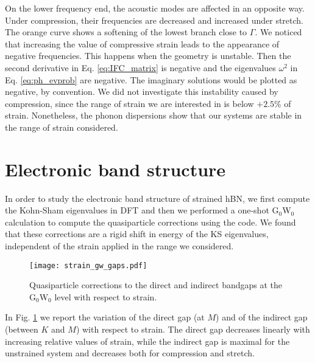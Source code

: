 On the lower frequency end, the acoustic modes are affected in an opposite way. Under compression, their frequencies are decreased and increased under stretch. The orange curve shows a softening of the lowest branch close to $\Gamma$. We noticed that increasing the value of compressive strain leads to the appearance of negative frequencies. This happens when the geometry is unstable. Then the second derivative in Eq. \eqref{eq:IFC_matrix} is negative and the eigenvalues $\omega^2$ in Eq. \eqref{eq:ph_evprob} are negative. The imaginary solutions would be plotted as negative, by convention. We did not investigate this instability caused by compression, since the range of strain we are interested in is below $+2.5\%$ of strain. Nonetheless, the phonon dispersions show that our systems are stable in the range of strain considered.

%
\section{Electronic band structure}
In order to study the electronic band structure of strained hBN, we first compute the Kohn-Sham eigenvalues in \acrshort{DFT} and then we performed a one-shot G$_0$W$_0$ calculation to compute the quasiparticle corrections using the \yambo code.\cite{Sangalli_2019} We found that these corrections are a rigid shift in energy of the KS eigenvalues, independent of the strain applied in the range we considered. 
\begin{figure}[tbp]
	\vspace{0.5cm}
	\setcapindent{2em}
	\centering
	\texttt{[image: strain\_gw\_gaps.pdf]}
	\caption{Quasiparticle corrections to the direct and indirect bandgaps at the G$_0$W$_0$ level with respect to strain.}
	\label{fig:strain_gw_gaps}
\end{figure}
In Fig. \ref{fig:strain_gw_gaps} we report the variation of the direct gap (at $M$) and of the indirect gap (between $K$ and $M$) with respect to strain. The direct gap decreases linearly with increasing relative values of strain, while the indirect gap is maximal for the unstrained system and decreases both for compression and stretch.

